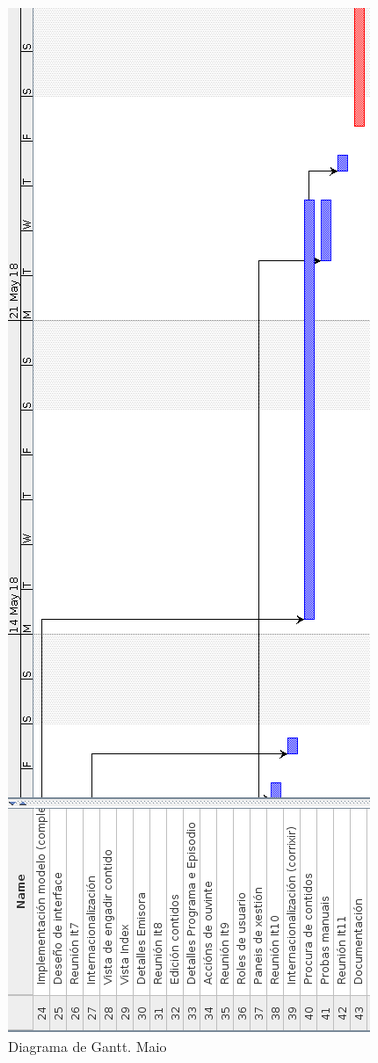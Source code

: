 \begin{figure}[H]
	\centering
	\includegraphics[scale=0.45,keepaspectratio=true]{./images/gantt/g10.png}
	\caption{Diagrama de Gantt. Maio}
\end{figure}

